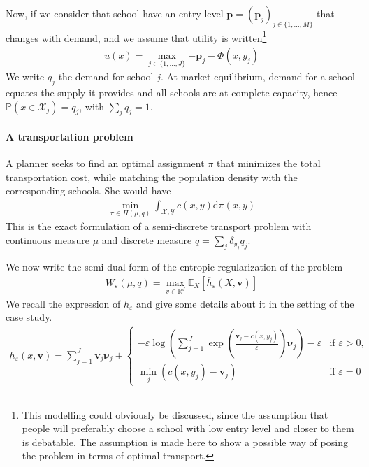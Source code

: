 Now, if we consider that school have an entry level $\mathbf{p} = (\mathbf{p}_j)_{j\in\{1, ..., M\}}$ that changes with demand, and we assume that utility is written\footnote{This modelling could obviously be discussed, since the assumption that people will preferably choose a school with low entry level and closer to them is debatable. The assumption is made here to show a possible way of posing the problem in terms of optimal transport.} 
\begin{align*}
    u(x) = \max_{j\in\{1, ..., J\}} {-\mathbf{p}_j - \Phi(x, y_j)}
\end{align*}
We write $q_j$ the demand for school $j$. At market equilibrium, demand for a school equates the supply it provides and all schools are at complete capacity, hence $\mathbb{P}(x\in \mathcal{X}_j) = q_j$, with $\sum_j q_j = 1$.

\paragraph{A transportation problem}
A planner seeks to find an optimal assignment $\pi$ that minimizes the total transportation cost, while matching the population density with the corresponding schools. She would have
\begin{align*}
    \min_{\pi\in \Pi(\mu, q)} \int_{\mathcal{X}, \mathcal{Y}} c(x, y)\text{d} \pi(x, y)
\end{align*}
This is the exact formulation of a semi-discrete transport problem with continuous measure $\mu$ and discrete measure $q = \sum_j \delta_{y_j} q_j$.

We now write the semi-dual form of the entropic regularization of the problem
\begin{align*}
    W_\varepsilon(\mu, q) = \max_{v\in\mathbb{R}^J} \mathbb{E}_X[\overline{h}_\varepsilon(X, \bm{v})]
\end{align*}
We recall the expression of $\overline{h}_\varepsilon$ and give some details about it in the setting of the case study. 
\begin{align*}
    \overline{h}_\varepsilon(x, \bm{v}) = \sum_{j=1}^J \bm{v}_j \bm{\nu}_j + 
    \begin{cases}
        -\varepsilon\log\left( \sum_{j=1}^J \exp\left(\frac{\bm{v}_j - c(x, y_j)}{\varepsilon}\right)\bm{\nu}_j \right) - \varepsilon & \text{if }\varepsilon > 0,\\
        \min_j (c(x, y_j) - \bm{v}_j) & \text{if }\varepsilon = 0
    \end{cases}
\end{align*}


